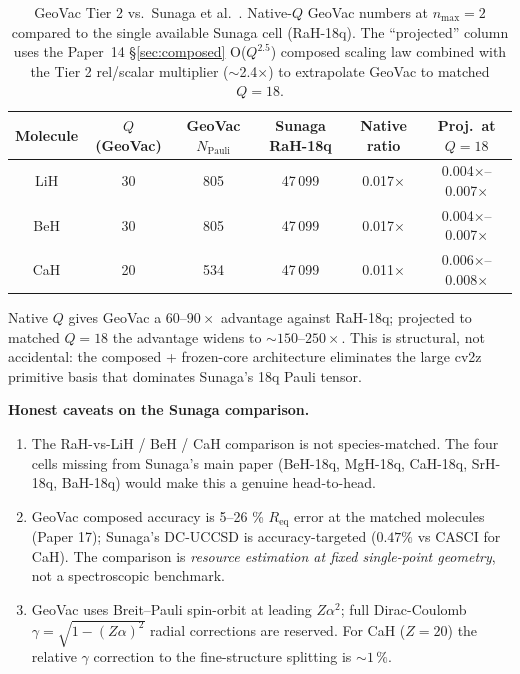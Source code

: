 \begin{table}[h]
\caption{GeoVac Tier 2 vs.\ Sunaga et al.~\cite{Sunaga2025}. Native-$Q$
GeoVac numbers at $n_{\max}=2$ compared to the single available
Sunaga cell (RaH-18q). The ``projected'' column uses the
Paper~14 \S\ref{sec:composed} O($Q^{2.5}$) composed scaling
law combined with the Tier 2 rel/scalar multiplier ($\sim$2.4$\times$)
to extrapolate GeoVac to matched $Q = 18$.}
\label{tab:sunaga}
\begin{ruledtabular}
\begin{tabular}{cccccc}
Molecule & $Q$ (GeoVac) & GeoVac $N_{\mathrm{Pauli}}$ & Sunaga RaH-18q & Native ratio & Proj.\ at $Q=18$ \\
\hline
LiH & 30 & 805 & 47\,099 & 0.017$\times$ & 0.004$\times$--0.007$\times$ \\
BeH & 30 & 805 & 47\,099 & 0.017$\times$ & 0.004$\times$--0.007$\times$ \\
CaH & 20 & 534 & 47\,099 & 0.011$\times$ & 0.006$\times$--0.008$\times$ \\
\end{tabular}
\end{ruledtabular}
\end{table}

Native $Q$ gives GeoVac a $60$--$90\times$ advantage against RaH-18q;
projected to matched $Q = 18$ the advantage widens to
$\sim 150$--$250\times$. This is structural, not accidental: the
composed + frozen-core architecture eliminates the large cv2z
primitive basis that dominates Sunaga's 18q Pauli tensor.

\textbf{Honest caveats on the Sunaga comparison.}
\begin{enumerate}
  \item The RaH-vs-LiH / BeH / CaH comparison is not species-matched.
    The four cells missing from Sunaga's main paper (BeH-18q,
    MgH-18q, CaH-18q, SrH-18q, BaH-18q) would make this a genuine
    head-to-head.
  \item GeoVac composed accuracy is 5--26 \% $R_{\mathrm{eq}}$ error
    at the matched molecules (Paper 17); Sunaga's DC-UCCSD is
    accuracy-targeted ($0.47\%$ vs CASCI for CaH). The comparison
    is \emph{resource estimation at fixed single-point geometry},
    not a spectroscopic benchmark.
  \item GeoVac uses Breit--Pauli spin-orbit at leading $Z\alpha^2$;
    full Dirac-Coulomb $\gamma = \sqrt{1-(Z\alpha)^2}$ radial
    corrections are reserved. For CaH ($Z=20$) the relative
    $\gamma$ correction to the fine-structure splitting is
    $\sim 1\,\%$.
\end{enumerate}

